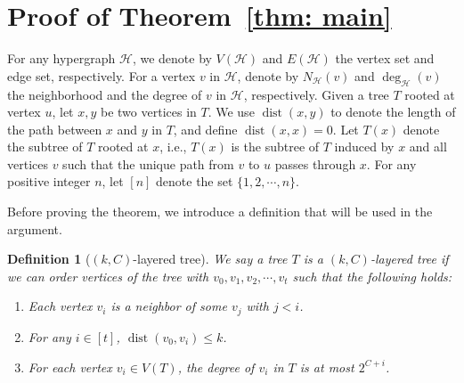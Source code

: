\documentclass[11pt,a4paper]{article}
\newtheorem{definition}{Definition} [section]
\newcommand{\dist}{\operatorname{dist}}
\begin{document}

\section{Proof of Theorem~\ref{thm: main}}
For any hypergraph $\mathcal{H}$, we denote by $V(\mathcal{H})$ and $E(\mathcal{H})$ the vertex set and edge set, respectively. For a vertex $v$ in $\mathcal{H}$, denote by $N_\mathcal{H}(v)$ and $\deg_\mathcal{H}(v)$ the neighborhood and the degree of $v$ in $\mathcal{H}$, respectively.
Given a tree $T$ rooted at vertex $u$, let $x,y$ be two vertices in $T$. We use $\dist(x,y)$ to denote the length of the path between $x$ and $y$ in $T$, and define $\dist(x,x)=0$. 
Let $T(x)$ denote the subtree of $T$ rooted at $x$, i.e., $T(x)$ is the subtree of $T$ induced by $x$ and all vertices $v$ such that the unique path from $v$ to $u$ passes through $x$.
For any positive integer $n$, let $[n]$ denote the set $\{1,2,\cdots,n\}$.

Before proving the theorem, we introduce a definition that will be used in the argument.
\begin{definition}[$(k,C)$-layered tree]\label{def: tree}
    We say a tree $T$ is a $(k,C)$-layered tree if we can order vertices of the tree with $v_0,v_1,v_2,\cdots,v_t$ such that the following holds:
    \begin{enumerate}[label=(\arabic*)]
    \item Each vertex $v_i$ is a neighbor of some $v_j$ with $j<i$.
    \item For any $i\in [t]$, $\dist(v_0,v_i) \le k$.
    \item For each vertex $v_i\in  V(T)$, the degree of $v_i$ in $T$ is at most $2^{C+i}$.
    \end{enumerate}
\end{definition}
\end{document}
